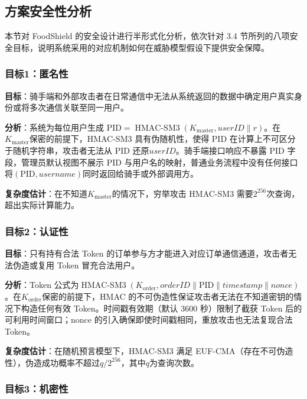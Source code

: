 \subsection{方案安全性分析}
\label{subsec:security_analysis}

本节对 FoodShield 的安全设计进行半形式化分析，依次针对 3.4 节所列的八项安全目标，说明系统采用的对应机制如何在威胁模型假设下提供安全保障。

\subsubsection*{目标1：匿名性}

\textbf{目标}：骑手端和外部攻击者在日常通信中无法从系统返回的数据中确定用户真实身份或将多次通信关联至同一用户。

\textbf{分析}：系统为每位用户生成 PID$= \operatorname{HMAC\text{-}SM3}(K_{\mathrm{master}},\allowbreak \mathit{userID} \| r)$。在$K_{\mathrm{master}}$保密的前提下，HMAC-SM3 具有伪随机性，使得 PID 在计算上不可区分于随机字符串，攻击者无法从 PID 还原$\mathit{userID}$。骑手端接口响应不暴露 PID 字段，管理员默认视图不展示 PID 与用户名的映射，普通业务流程中没有任何接口将$(\mathrm{PID}, \mathit{username})$同时返回给骑手或外部调用方。

\textbf{复杂度估计}：在不知道$K_{\mathrm{master}}$的情况下，穷举攻击 HMAC-SM3 需要$2^{256}$次查询，超出实际计算能力。

\subsubsection*{目标2：认证性}

\textbf{目标}：只有持有合法 Token 的订单参与方才能进入对应订单通信通道，攻击者无法伪造或复用 Token 冒充合法用户。

\textbf{分析}：Token 公式为$\operatorname{HMAC\text{-}SM3}(K_{\mathrm{order}},\allowbreak \mathit{orderID} \| \mathrm{PID} \| \mathit{timestamp} \| \mathit{nonce})$。在$K_{\mathrm{order}}$保密的前提下，HMAC 的不可伪造性保证攻击者无法在不知道密钥的情况下构造任何有效 Token。时间戳有效期（默认 3600 秒）限制了截获 Token 后的可利用时间窗口；nonce 的引入确保即使时间戳相同，重放攻击也无法复现合法 Token。

\textbf{复杂度估计}：在随机预言模型下，HMAC-SM3 满足 EUF-CMA（存在不可伪造性），伪造成功概率不超过$q/2^{256}$，其中$q$为查询次数。

\subsubsection*{目标3：机密性}

